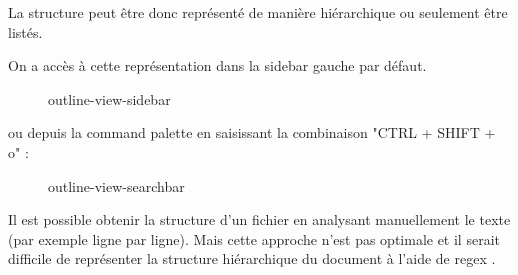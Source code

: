 \documentclass[
    iict, %
    il, %
]{heig-tb}
\begin{document}
La structure peut être donc représenté de manière hiérarchique ou seulement être listés.

On a accès à cette représentation dans la sidebar gauche par défaut.

\begin{figure}[!h]
    \begin{center}
    \end{center}
    \caption[Outline view disponible depuis la sidebar]{\label{outline-view-sidebar} outline-view-sidebar}
\end{figure}

ou depuis la command palette en saisissant la combinaison "CTRL + SHIFT + o" :

\begin{figure}[!h]
    \begin{center}
    \end{center}
    \caption[Outline view disponible depuis la searchbar]{\label{outline-view-searchbar} outline-view-searchbar}
\end{figure}

Il est possible obtenir la structure d'un fichier en analysant manuellement le texte (par exemple ligne par ligne).
Mais cette approche n'est pas optimale et il serait difficile de représenter la structure hiérarchique du document à l'aide de regex \cite{antlr-mega-tutorial}.
\end{document}
